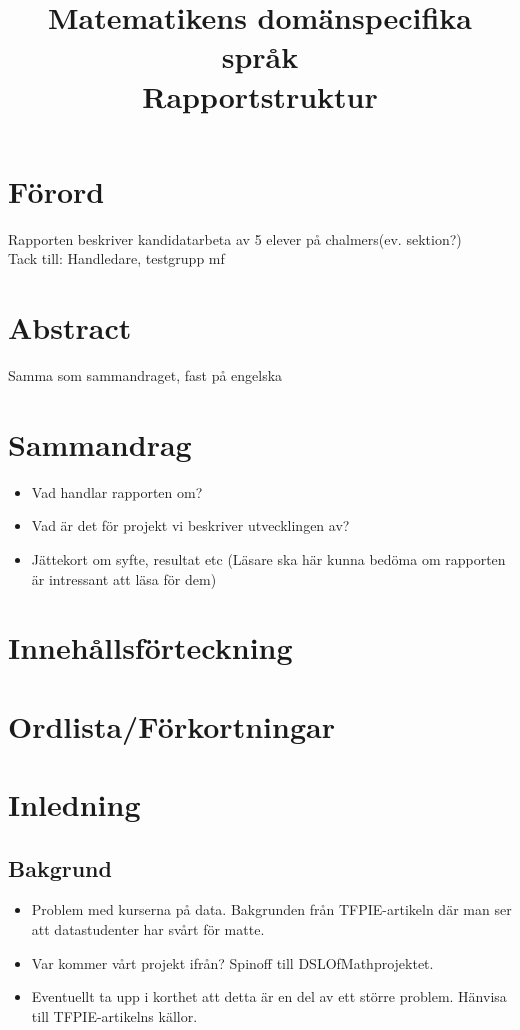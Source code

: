 \documentclass{article}
\title{Matematikens domänspecifika språk \\
\large Rapportstruktur}
\author{}
\date{}
\begin{document}
\maketitle




\section{Förord}
Rapporten beskriver kandidatarbeta av 5 elever på chalmers(ev. sektion?) \\
Tack till: Handledare, testgrupp mf

\section{Abstract}
Samma som sammandraget, fast på engelska

\section{Sammandrag}
\begin{itemize}
\item Vad handlar rapporten om?
\item Vad är det för projekt vi beskriver utvecklingen av?
\item Jättekort om syfte, resultat etc (Läsare ska här kunna bedöma om rapporten är intressant att läsa för dem)
\end{itemize}
  

\section{Innehållsförteckning}

\section{Ordlista/Förkortningar}

\section{Inledning}

\subsection{Bakgrund}
\begin{itemize}
\item Problem med kurserna på data. Bakgrunden från TFPIE-artikeln där man ser att datastudenter har svårt för matte.
\item Var kommer vårt projekt ifrån? Spinoff till DSLOfMathprojektet. 
\item Eventuellt ta upp i korthet att detta är en del av ett större problem. Hänvisa till TFPIE-artikelns källor.
\end{itemize}
\end{document}
